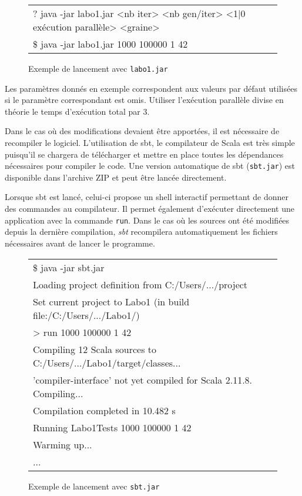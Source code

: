 \documentclass[a4paper,11pt]{article}
\begin{document}
\begin{figure}[h]
\begin{tabular}{l}
	\hline
	{\ttfamily\color{gray}
	? java -jar labo1.jar <nb iter> <nb gen/iter> <1|0 exécution parallèle> <graine>}\\
	{\ttfamily
	\$ java -jar labo1.jar 1000 100000 1 42}\\
	\hline
\end{tabular}
\caption{Exemple de lancement avec \texttt{labo1.jar}}
\end{figure}

Les paramètres donnés en exemple correspondent aux valeurs par défaut utilisées si le paramètre correspondant est omis. Utiliser l'exécution parallèle divise en théorie le temps d'exécution total par 3.

Dans le cas où des modifications devaient être apportées, il est nécessaire de recompiler le logiciel. L'utilisation de sbt, le compilateur de Scala est très simple puisqu'il se chargera de télécharger et mettre en place toutes les dépendances nécessaires pour compiler le code. Une version automatique de sbt (\texttt{sbt.jar}) est disponible dans l'archive ZIP et peut être lancée directement.

Lorsque sbt est lancé, celui-ci propose un shell interactif permettant de donner des commandes au compilateur. Il permet également d'exécuter directement une application avec la commande \texttt{run}. Dans le cas où les sources ont été modifiées depuis la dernière compilation, \emph{sbt} recompilera automatiquement les fichiers nécessaires avant de lancer le programme.

\begin{figure}[h]
\begin{tabular}{l}
	\hline
	{\ttfamily \$ java -jar sbt.jar}\\
	{\ttfamily [info] Loading project definition from C:/Users/.../project}\\
	{\ttfamily [info] Set current project to Labo1 (in build file:/C:/Users/.../Labo1/)}\\
	{\ttfamily > run 1000 100000 1 42}\\
	{\ttfamily [info] Compiling 12 Scala sources to C:/Users/.../Labo1/target/classes...}\\
	{\ttfamily [info] 'compiler-interface' not yet compiled for Scala 2.11.8. Compiling...}\\
	{\ttfamily [info]   Compilation completed in 10.482 s}\\
	{\ttfamily [info] Running Labo1Tests 1000 100000 1 42}\\
	{\ttfamily Warming up...}\\
	{\ttfamily ...}\\
	\hline
\end{tabular}
\caption{Exemple de lancement avec \texttt{sbt.jar}}
\end{figure}
\end{document}
